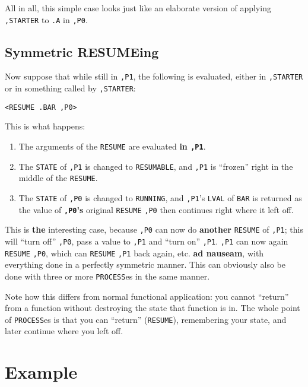 \documentclass[a4paper]{scrbook}
\providecommand{\tightlist}{%
  \setlength{\itemsep}{0pt}\setlength{\parskip}{0pt}}
\begin{document}
All in all, this simple case looks just like an elaborate version of applying \texttt{,STARTER} to \texttt{.A} in
\texttt{,P0}.

\subsection{Symmetric RESUMEing}\label{symmetric-resumeing}

Now suppose that while still in \texttt{,P1}, the following is evaluated, either in \texttt{,STARTER} or in something
called by \texttt{,STARTER}:

\begin{verbatim}
<RESUME .BAR ,P0>
\end{verbatim}

This is what happens:

\begin{enumerate}
\def\labelenumi{\arabic{enumi}.}
\tightlist
\item
  The arguments of the \texttt{RESUME} are evaluated \textbf{in \texttt{,P1}}.
\item
  The \texttt{STATE} of \texttt{,P1} is changed to \texttt{RESUMABLE}, and \texttt{,P1} is ``frozen'' right in the middle
  of the \texttt{RESUME}.
\item
  The \texttt{STATE} of \texttt{,P0} is changed to \texttt{RUNNING}, and \texttt{,P1}'s \texttt{LVAL} of \texttt{BAR} is
  returned as the value of \textbf{\texttt{,P0}'s} original \texttt{RESUME} \texttt{,P0} then continues right where it left
  off.
\end{enumerate}

This is \textbf{the} interesting case, because \texttt{,P0} can now do \textbf{another} \texttt{RESUME} of \texttt{,P1};
this will ``turn off'' \texttt{,P0}, pass a value to \texttt{,P1} and ``turn on'' \texttt{,P1}. \texttt{,P1} can now again
\texttt{RESUME} \texttt{,P0}, which can \texttt{RESUME} \texttt{,P1} back again, etc. \textbf{ad nauseam}, with everything
done in a perfectly symmetric manner. This can obviously also be done with three or more \texttt{PROCESS}es in the same
manner.

Note how this differs from normal functional application: you cannot ``return'' from a function without destroying the
state that function is in. The whole point of \texttt{PROCESS}es is that you can ``return'' (\texttt{RESUME}), remembering
your state, and later continue where you left off.

\section{Example}\label{example-1}
\end{document}
